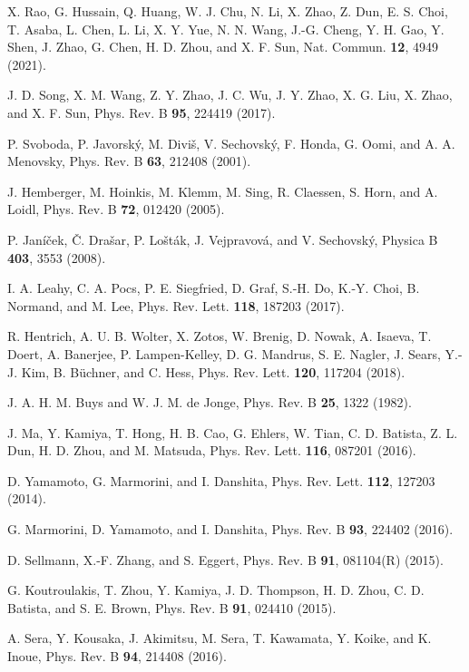 \documentclass[aps,twocolumn,superscriptaddress,showpacs]{revtex4-1}
\begin{document}
\begin{thebibliography}{}
X. Rao, G. Hussain, Q. Huang, W. J. Chu, N. Li, X. Zhao, Z. Dun, E. S. Choi, T. Asaba, L. Chen, L. Li, X. Y. Yue, N. N. Wang, J.-G. Cheng, Y. H. Gao, Y. Shen, J. Zhao, G. Chen, H. D. Zhou, and X. F. Sun, Nat. Commun. {\bf 12}, 4949 (2021).

J. D. Song, X. M. Wang, Z. Y. Zhao, J. C. Wu, J. Y. Zhao, X. G. Liu, X. Zhao, and X. F. Sun, Phys. Rev. B {\bf 95}, 224419 (2017).

P. Svoboda, P. Javorsk\'{y}, M. Divi\v{s}, V. Sechovsk\'{y}, F. Honda, G. Oomi, and A. A. Menovsky, Phys. Rev. B {\bf 63}, 212408 (2001).

J. Hemberger, M. Hoinkis, M. Klemm, M. Sing, R. Claessen, S. Horn, and A. Loidl, Phys. Rev. B {\bf 72}, 012420 (2005).

P. Jan\'{i}\v{c}ek, \v{C}. Dra\v{s}ar, P. Lo\v{s}t\'{a}k, J. Vejpravov\'{a}, and V. Sechovsk\'{y}, Physica B {\bf 403}, 3553 (2008).

I. A. Leahy, C. A. Pocs, P. E. Siegfried, D. Graf, S.-H. Do, K.-Y. Choi, B. Normand, and M. Lee, Phys. Rev. Lett. {\bf 118}, 187203 (2017).

R. Hentrich, A. U. B. Wolter, X. Zotos, W. Brenig, D. Nowak, A. Isaeva, T. Doert, A. Banerjee, P. Lampen-Kelley, D. G. Mandrus, S. E. Nagler, J. Sears, Y.-J. Kim, B. B\"uchner, and C. Hess, Phys. Rev. Lett. {\bf 120}, 117204 (2018).

J. A. H. M. Buys and W. J. M. de Jonge, Phys. Rev. B {\bf 25}, 1322 (1982).

J. Ma, Y. Kamiya, T. Hong, H. B. Cao, G. Ehlers, W. Tian, C. D. Batista, Z. L. Dun, H. D. Zhou, and M. Matsuda, Phys. Rev. Lett. {\bf 116}, 087201 (2016).

D. Yamamoto, G. Marmorini, and I. Danshita, Phys. Rev. Lett. {\bf 112}, 127203 (2014).

G. Marmorini, D. Yamamoto, and I. Danshita, Phys. Rev. B {\bf 93}, 224402 (2016).

D. Sellmann, X.-F. Zhang, and S. Eggert, Phys. Rev. B {\bf 91}, 081104(R) (2015).

G. Koutroulakis, T. Zhou, Y. Kamiya, J. D. Thompson, H. D. Zhou, C. D. Batista, and S. E. Brown, Phys. Rev. B {\bf 91}, 024410 (2015).

A. Sera, Y. Kousaka, J. Akimitsu, M. Sera, T. Kawamata, Y. Koike, and K. Inoue, Phys. Rev. B {\bf 94}, 214408 (2016).


\end{thebibliography}
\end{document}
